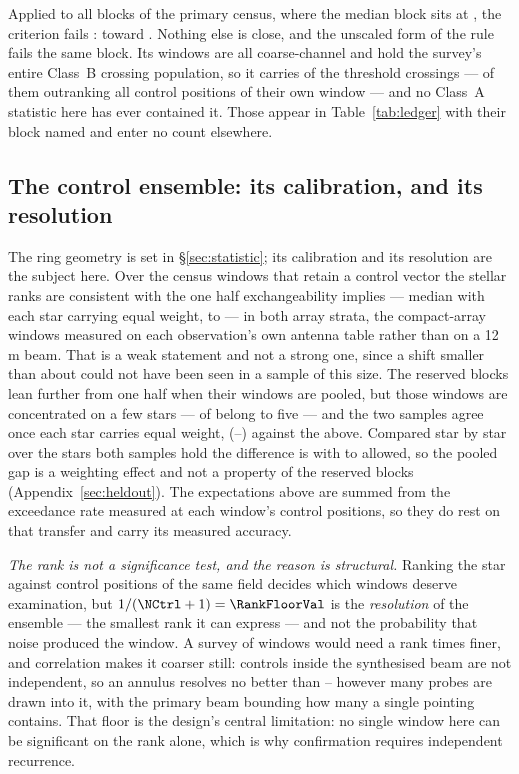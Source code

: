 Applied to all \BqNBlocks{} blocks of the primary census, where the median
block sits at \BqQMed, the criterion fails \BqNFail: \BqFailBlock{} toward
\BqFailStar. Nothing else is close, and the unscaled form of the rule fails
the same \BqRawNFail{} block. Its \BqFailNWin{} windows are all coarse-channel and
hold the survey's entire Class~B crossing population, so it carries
\EvNCrossFlag{} of the \EvNCrossRaw{} threshold crossings --- \EvNRankFlag{}
of them outranking all \NCtrl{} control positions of their own window --- and
no Class~A statistic here has ever contained it. Those \EvNCrossFlag{} appear
in Table~\ref{tab:ledger} with their block named and enter no count
elsewhere.

\subsection{The control ensemble: its calibration, and its resolution}

The ring geometry is set in \S\ref{sec:statistic}; its calibration and its
resolution are the subject here. Over the \VerNTested{} census windows that
retain a control vector the stellar ranks are consistent with the one half
exchangeability implies --- median \BkRankBalSurv{} with each star carrying
equal weight, \BkRankBalSurvLo{} to \BkRankBalSurvHi{} --- in both array
strata, the compact-array windows measured on each observation's own antenna
table rather than on a 12\,m beam. That is a weak statement and not a strong
one, since a shift smaller than about \VerKsPowerAca{} could not have been
seen in a sample of this size. The reserved blocks lean further from one half
when their windows are pooled, but those windows are concentrated on a few
stars --- \BkRankTopFiveWin{} of \HoWin{} belong to five --- and the two
samples agree once each star carries equal weight, \BkRankBalHo{}
(\BkRankBalHoLo--\BkRankBalHoHi) against the \BkRankBalSurv{} above.
Compared star by star over the \BkRankPairedStars{} stars both samples hold
the difference is \BkRankPaired{} with \BkRankPairedLo{} to
\BkRankPairedHi{} allowed, so the pooled gap is a weighting effect and not a
property of the reserved blocks (Appendix~\ref{sec:heldout}). The
expectations above are summed from the exceedance rate measured at each
window's control positions, so they do rest on that transfer and carry its
measured accuracy.

\emph{The rank is not a significance test, and the reason is structural.}
Ranking the star against \NCtrl{} control positions of the same field
decides which windows deserve examination, but $1/(\NCtrl+1)=\RankFloorVal$
is the \emph{resolution} of the ensemble --- the smallest rank it can
express --- and not the probability that noise produced the window. A survey
of \NWindows{} windows would need a rank \BonfRankRatio{} times finer, and
correlation makes it coarser still: controls inside the synthesised beam are
not independent, so an annulus resolves no better than
\RankEffLo--\RankEffHi{} however many probes are drawn into it, with the
primary beam bounding how many a single pointing contains. That floor is the
design's central limitation: no single window here can be significant on the
rank alone, which is why confirmation requires independent recurrence.


